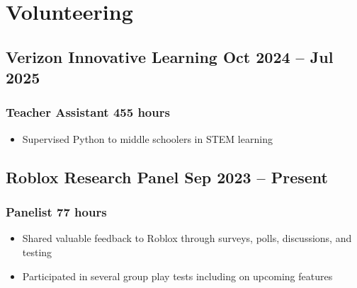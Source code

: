 \documentclass{my_cv}
\begin{document}
\section{Volunteering}


\subsection{Verizon Innovative Learning \hfill Oct 2024 -- Jul 2025}
\subsubsection{Teacher Assistant \hfill 455 hours}
\begin{itemize}
    \item Supervised Python to middle schoolers in STEM learning
\end{itemize}

\subsection{Roblox Research Panel \hfill Sep 2023 -- Present}
\subsubsection{Panelist \hfill 77 hours}
\begin{itemize}
    \item Shared valuable feedback to Roblox through surveys, polls, discussions, and testing
    \item Participated in several group play tests including on upcoming features
\end{itemize}
\end{document}
